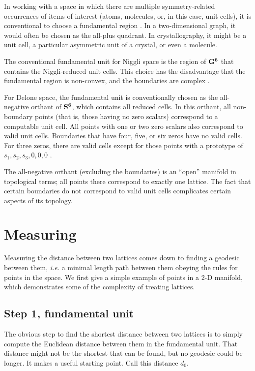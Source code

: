 \documentclass[preprint]{iucr}              %
\numberwithin{equation}{section}
\newcommand{\SVI}[0]{$\bf{S^{6}}$}
\newcommand{\GVI}[0]{$\bf{G^{6}}$}
\begin{document}
	In working with a space in which there are 
	multiple symmetry-related occurrences of items of interest (atoms, molecules, or,
	in this case, unit cells), it is conventional to choose a fundamental
	region \cite{enwiki:1028832752}. In a two-dimensional graph, it would often be chosen as the all-plus
	quadrant. In crystallography, it might be a unit cell, a
	particular asymmetric unit of a crystal, or even a molecule.
	
	The conventional fundamental unit for Niggli space is the region
	of \GVI{} that contains the Niggli-reduced unit cells. This choice
	has the disadvantage that the fundamental region is non-convex,
	and the boundaries are complex \cite{Andrews2014}.
	
	For Delone space, the fundamental unit is conventionally chosen
	as the all-negative orthant of \SVI{}, which contains all 
	reduced cells. In this orthant, all non-boundary 
	points (that is, those having no zero scalars) correspond to
	a computable unit cell. All points with one or two zero scalars also
	correspond to valid unit cells. Boundaries that have
	four, five, or six zeros have no valid cells. For three zeros, there are
	valid cells except for those points with a prototype of
	$s_1, s_2, s_3, 0, 0, 0$ \cite{Andrews2019b}.
	
	The all-negative orthant (excluding the boundaries) is 
	an ``open'' manifold in topological terms; all points
	there correspond to exactly one lattice. The fact that
	certain boundaries do not correspond to valid unit
	cells complicates certain aspects of its topology.
	
		
	
	\section{Measuring}

	
	Measuring the distance between two lattices
	comes down to finding a geodesic between them, {\it i.e.}
	a minimal length path between them obeying the rules for points
	in the space. We first give a simple example of points in
	a 2-D manifold, which demonstrates some of the complexity of treating lattices.
	
	\subsection{Step 1, fundamental unit}
	\label{fundamental}
	
	The obvious step to find the shortest distance between two
	lattices is to simply compute the Euclidean distance between
	them in the fundamental unit. That distance might not be the
	shortest that can be found, but no geodesic could 
	be longer. It makes a useful starting point. Call 
	this distance $d_0$.
	
\end{document}
